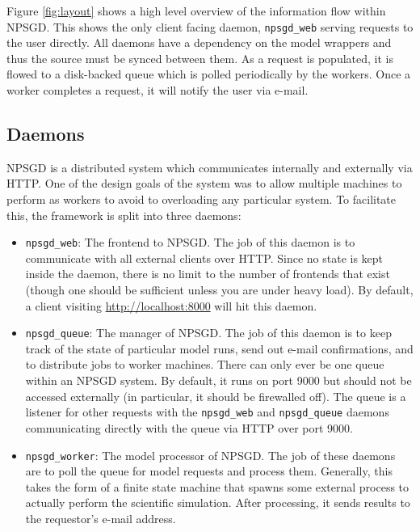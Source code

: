 \documentclass{article}
\begin{document}
Figure \ref{fig:layout} shows a high level overview of the information flow
within NPSGD. This shows the only client facing daemon, \texttt{npsgd\_web}
serving requests to the user directly. All daemons have a dependency on the
model wrappers and thus the source must be synced between them. As a request is
populated, it is flowed to a disk-backed queue which is polled periodically by
the workers. Once a worker completes a request, it will notify the user via
e-mail.

\subsection{Daemons}
NPSGD is a distributed system which communicates internally and externally via
HTTP. One of the design goals of the system was to allow multiple machines to
perform as workers to avoid to overloading any particular system. To
facilitate this, the framework is split into three daemons:
\begin{itemize}
    \item \texttt{npsgd\_web}: The frontend to NPSGD. The job of this daemon is
    to communicate with all external clients over HTTP. Since no state is kept
    inside the daemon, there is no limit to the number of frontends that exist (though one
    should be sufficient unless you are under heavy load). By default, a
    client visiting \url{http://localhost:8000} will hit this daemon.

    \item \texttt{npsgd\_queue}: The manager of NPSGD. The job of this daemon is
    to keep track of the state of particular model runs, send out e-mail
    confirmations, and to distribute jobs to worker machines. There can only
    ever be one queue within an NPSGD system. By default, it runs on port 9000
    but should not be accessed externally (in particular, it should be
    firewalled off). The queue is a listener for other requests with the 
    \texttt{npsgd\_web} and \texttt{npsgd\_queue} daemons communicating directly
    with the queue via HTTP over port 9000.

    \item \texttt{npsgd\_worker}: The model processor of NPSGD. The job of these
    daemons are to poll the queue for model requests and process them.
    Generally, this takes the form of a finite state machine that spawns some
    external process to actually perform the scientific simulation. After
    processing, it sends results to the requestor's e-mail address.
\end{itemize}
\end{document}
